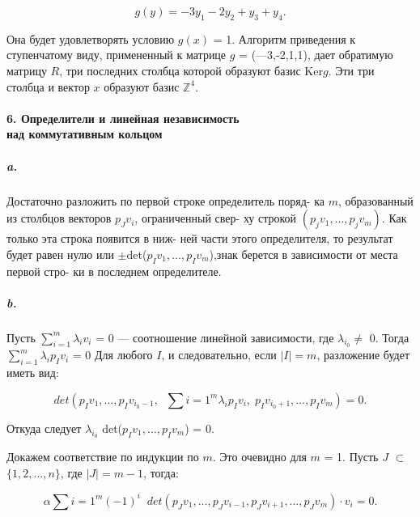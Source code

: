 \documentclass{mai_book}
\begin{document}
{\begin{equation*}
g(y) = -3y_1 - 2y_2 + y_3 + y_4.
\end{equation*}

\noindent Она будет удовлетворять условию $g(x)$ = 1. Алгоритм приведения к ступенчатому виду, примененный к матрице $g$ = (—3,-2,1,1), дает обратимую матрицу $R$, три последних столбца которой образуют базис Ker{$g$}. Эти три столбца и вектор $x$ образуют базис $\mathbb {Z}^{4}$.




\paragraph{6. Определители и линейная независимость\\
над коммутативным кольцом}

\subparagraph{a.} Достаточно разложить по первой строке определитель поряд-
ка $m$, образованный из столбцов векторов $p_{J}v_{i}$, ограниченный свер-
ху строкой $(p_{j}v_{1},\ldots,p_{j}v_{m})$. Как только эта строка появится в ниж-
ней части этого определителя, то результат будет равен нулю или
$\pm$det($p_{I}v_{1},\ldots,p_{I}v_{m}$),знак берется в зависимости от места первой стро-
ки в последнем определителе.

\subparagraph{b.} Пусть $\sum_{i=1}^{m} \lambda_{i}v_{i}$ = 0 --- соотношение линейной зависимости, где
$\lambda_{i_0} \neq$ 0. Тогда $\sum_{i=1}^{m} \lambda_{i}p_{I}v_{i}$ = 0 Для любого $I$, и следовательно, если
$|I| = m$, разложение будет иметь вид:

\begin{equation*}
det(p_{I}v_1,\ldots,p_{I}v_{i_{0}-1},\;\;\sum\limits {i=1}^m \lambda_{i}p_{I}v_{i},\;p_{I}v_{i_{0}+1},\ldots,p_{I}v_{m}) = 0.
\end{equation*}

\noindent Откуда следует $\lambda_{i_0}$ det($p_{I}v_{1},\ldots,p_{I}v_{m}$) = 0.

Докажем соответствие по индукции по $m$. Это очевидно для $m$ = 1.
Пусть $J$ $\subset$ $\{1,2,\ldots,n\}$, где $|J| = m - 1$, тогда:

\setcounter{equation}{5}

\begin{equation}
\alpha \sum\limits {i=1}^m (-1)^{i}\;\;det(p_{J}v_{1},\ldots,p_{J}v_{i-1},p_{J}v_{i+1},\ldots,p_{J}v_{m}) \cdot v_{i} = 0.
\end{equation}

}
\end{document}
